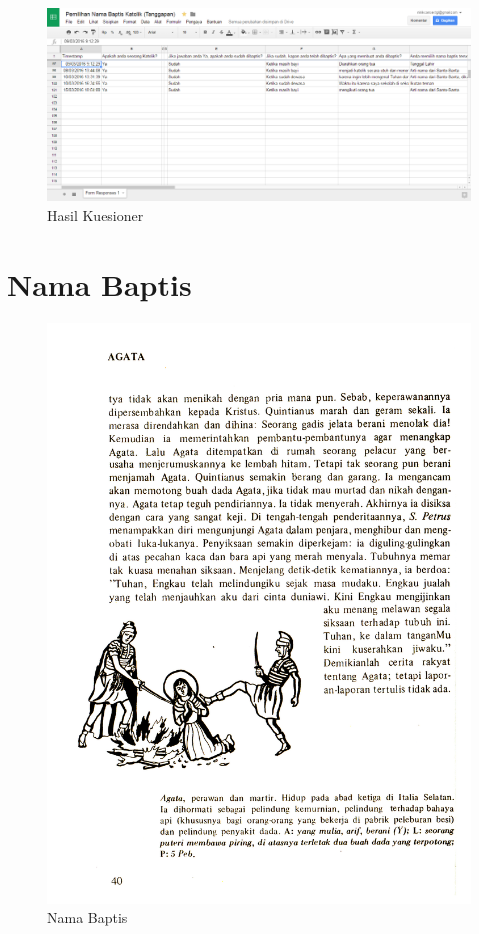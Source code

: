 	\begin{figure}[htbp]
		\centering
			\includegraphics[scale=0.38]{Gambar/kuesioner6.PNG}
			\caption{Hasil Kuesioner}
		\label{fig:kues6}
	\end{figure}
	
\section{Nama Baptis}
\label{sec:namabaptiss}

\begin{figure}[htbp]
		\centering
			\includegraphics[scale=0.9]{Gambar/sc0004.JPG}
			\caption{Nama Baptis}
		\label{fig:namabaptis1}
	\end{figure}
	
